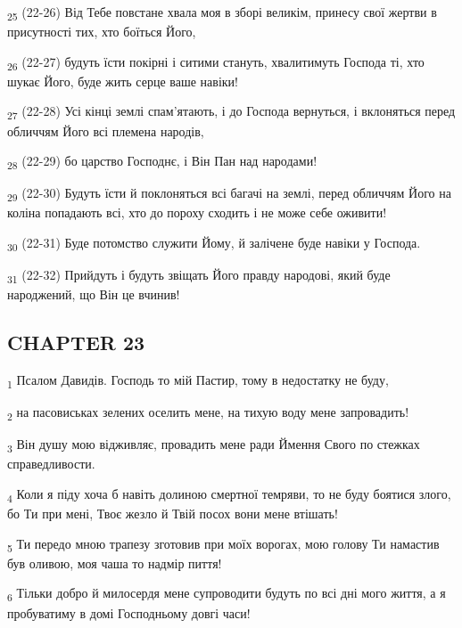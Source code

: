 \begin{tcolorbox}
\textsubscript{25} (22-26) Від Тебе повстане хвала моя в зборі великім, принесу свої жертви в присутності тих, хто боїться Його,
\end{tcolorbox}
\begin{tcolorbox}
\textsubscript{26} (22-27) будуть їсти покірні і ситими стануть, хвалитимуть Господа ті, хто шукає Його, буде жить серце ваше навіки!
\end{tcolorbox}
\begin{tcolorbox}
\textsubscript{27} (22-28) Усі кінці землі спам'ятають, і до Господа вернуться, і вклоняться перед обличчям Його всі племена народів,
\end{tcolorbox}
\begin{tcolorbox}
\textsubscript{28} (22-29) бо царство Господнє, і Він Пан над народами!
\end{tcolorbox}
\begin{tcolorbox}
\textsubscript{29} (22-30) Будуть їсти й поклоняться всі багачі на землі, перед обличчям Його на коліна попадають всі, хто до пороху сходить і не може себе оживити!
\end{tcolorbox}
\begin{tcolorbox}
\textsubscript{30} (22-31) Буде потомство служити Йому, й залічене буде навіки у Господа.
\end{tcolorbox}
\begin{tcolorbox}
\textsubscript{31} (22-32) Прийдуть і будуть звіщать Його правду народові, який буде народжений, що Він це вчинив!
\end{tcolorbox}
\subsection{CHAPTER 23}
\begin{tcolorbox}
\textsubscript{1} Псалом Давидів. Господь то мій Пастир, тому в недостатку не буду,
\end{tcolorbox}
\begin{tcolorbox}
\textsubscript{2} на пасовиськах зелених оселить мене, на тихую воду мене запровадить!
\end{tcolorbox}
\begin{tcolorbox}
\textsubscript{3} Він душу мою відживляє, провадить мене ради Ймення Свого по стежках справедливости.
\end{tcolorbox}
\begin{tcolorbox}
\textsubscript{4} Коли я піду хоча б навіть долиною смертної темряви, то не буду боятися злого, бо Ти при мені, Твоє жезло й Твій посох вони мене втішать!
\end{tcolorbox}
\begin{tcolorbox}
\textsubscript{5} Ти передо мною трапезу зготовив при моїх ворогах, мою голову Ти намастив був оливою, моя чаша то надмір пиття!
\end{tcolorbox}
\begin{tcolorbox}
\textsubscript{6} Тільки добро й милосердя мене супроводити будуть по всі дні мого життя, а я пробуватиму в домі Господньому довгі часи!
\end{tcolorbox}
